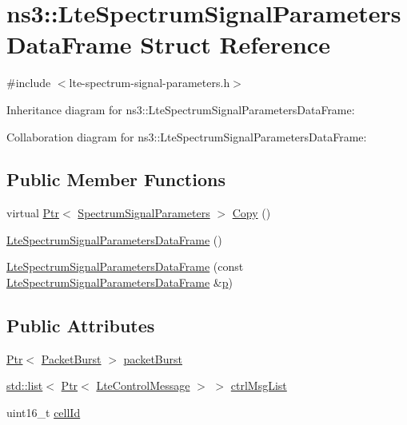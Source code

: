 \hypertarget{structns3_1_1LteSpectrumSignalParametersDataFrame}{}\section{ns3\+:\+:Lte\+Spectrum\+Signal\+Parameters\+Data\+Frame Struct Reference}
\label{structns3_1_1LteSpectrumSignalParametersDataFrame}


{\ttfamily \#include $<$lte-\/spectrum-\/signal-\/parameters.\+h$>$}



Inheritance diagram for ns3\+:\+:Lte\+Spectrum\+Signal\+Parameters\+Data\+Frame\+:


Collaboration diagram for ns3\+:\+:Lte\+Spectrum\+Signal\+Parameters\+Data\+Frame\+:
\subsection*{Public Member Functions}
\begin{DoxyCompactItemize}
\item 
virtual \hyperlink{classns3_1_1Ptr}{Ptr}$<$ \hyperlink{structns3_1_1SpectrumSignalParameters}{Spectrum\+Signal\+Parameters} $>$ \hyperlink{structns3_1_1LteSpectrumSignalParametersDataFrame_ac13f36d239d4aeea449b48be7ff2078d}{Copy} ()
\item 
\hyperlink{structns3_1_1LteSpectrumSignalParametersDataFrame_a48c24646eb0528ae58262a02f40ca9c0}{Lte\+Spectrum\+Signal\+Parameters\+Data\+Frame} ()
\item 
\hyperlink{structns3_1_1LteSpectrumSignalParametersDataFrame_ad466771ee6f5ba6d105f6608135870ad}{Lte\+Spectrum\+Signal\+Parameters\+Data\+Frame} (const \hyperlink{structns3_1_1LteSpectrumSignalParametersDataFrame}{Lte\+Spectrum\+Signal\+Parameters\+Data\+Frame} \&\hyperlink{lte__link__budget__x2__handover__measures_8m_ac9de518908a968428863f829398a4e62}{p})
\end{DoxyCompactItemize}
\subsection*{Public Attributes}
\begin{DoxyCompactItemize}
\item 
\hyperlink{classns3_1_1Ptr}{Ptr}$<$ \hyperlink{classns3_1_1PacketBurst}{Packet\+Burst} $>$ \hyperlink{structns3_1_1LteSpectrumSignalParametersDataFrame_add8e31df8ae232dec2558cbb733c311e}{packet\+Burst}
\item 
\hyperlink{openflow-interface_8h_afd9bcfa176617760671b67580f536fa7}{std\+::list}$<$ \hyperlink{classns3_1_1Ptr}{Ptr}$<$ \hyperlink{classns3_1_1LteControlMessage}{Lte\+Control\+Message} $>$ $>$ \hyperlink{structns3_1_1LteSpectrumSignalParametersDataFrame_aa749709d3d235856a82e749e331e3e58}{ctrl\+Msg\+List}
\item 
uint16\+\_\+t \hyperlink{structns3_1_1LteSpectrumSignalParametersDataFrame_aed33b300ea4ff7a70f6d42c9ea2226ea}{cell\+Id}
\end{DoxyCompactItemize}
